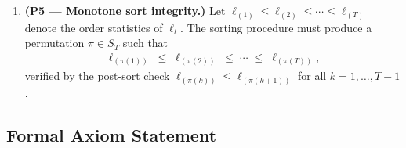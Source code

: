 \documentclass[12pt,openany]{book}
\numberwithin{equation}{chapter}
\theoremstyle{plain}
\theoremstyle{definition}
\theoremstyle{remark}
\numberwithin{equation}{chapter}
\theoremstyle{plain}
\begin{document}
\begin{enumerate}
  \item \textbf{(P5 --- Monotone sort integrity.)}
        Let $\ell_{(1)} \leq \ell_{(2)} \leq \cdots \leq \ell_{(T)}$
        denote the order statistics of $\boldsymbol{\ell}_t$.  The
        sorting procedure must produce a permutation
        $\pi \in S_T$ such that
        \begin{align}
          \ell_{(\pi(1))} \;\leq\; \ell_{(\pi(2))}
            \;\leq\; \cdots \;\leq\; \ell_{(\pi(T))},
            \label{eq:p5-sort}
        \end{align}
        verified by the post-sort check
        $\ell_{(\pi(k))} \leq \ell_{(\pi(k+1))}$
        for all $k = 1,\ldots,T-1$.
\end{enumerate}

\subsection{Formal Axiom Statement}
\label{ssec:gate-axiom}
\end{document}
